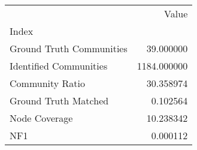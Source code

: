\begin{tabular}{lr}
\toprule
{} &        Value \\
Index                    &              \\
\midrule
Ground Truth Communities &    39.000000 \\
Identified Communities   &  1184.000000 \\
Community Ratio          &    30.358974 \\
Ground Truth Matched     &     0.102564 \\
Node Coverage            &    10.238342 \\
NF1                      &     0.000112 \\
\bottomrule
\end{tabular}
